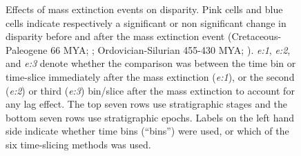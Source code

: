 \documentclass[12pt,a4paper]{article}
\begin{document}
\begin{figure}[!htbp]
    \centering
    \caption[Extinction example datasets.]
    {Effects of mass extinction events on disparity.
    Pink cells and blue cells indicate respectively a significant or non significant change in disparity before and after the mass extinction event (Cretaceous-Paleogene 66 MYA; \citealt{beckancient2014}; Ordovician-Silurian 455-430 MYA; \citealt{wright2017bayesian}).
    \textit{e:1}, \textit{e:2}, and \textit{e:3} denote whether the comparison was between the time bin or time-slice immediately after the mass extinction (\textit{e:1}), or the second (\textit{e:2}) or third (\textit{e:3}) bin/slice after the mass extinction to account for any lag effect.
    The top seven rows use stratigraphic stages and the bottom seven rows use stratigraphic epochs.
    Labels on the left hand side indicate whether time bins (``bins'') were used, or which of the six time-slicing methods was used.}
    \label{figure:extinction1}
\end{figure}
\end{document}
